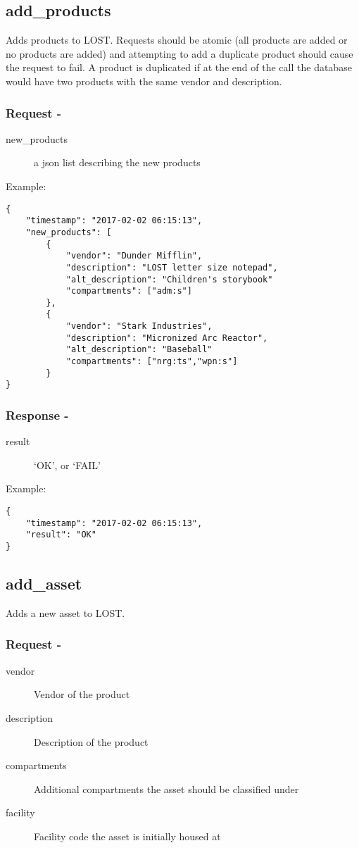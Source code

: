 \subsection*{add\_products}
Adds products to LOST. Requests should be atomic (all products are added or no products are added) and attempting to add a duplicate product should cause the request to fail. A product is duplicated if at the end of the call the database would have two products with the same vendor and description.
\\

\subsubsection*{Request -}
\begin{description}
\item[new\_products] a json list describing the new products
\end{description}

\noindent Example:
\begin{verbatim}
{
    "timestamp": "2017-02-02 06:15:13",
    "new_products": [
        {
            "vendor": "Dunder Mifflin",
            "description": "LOST letter size notepad",
            "alt_description": "Children's storybook"
            "compartments": ["adm:s"]
        },
        {
            "vendor": "Stark Industries",
            "description": "Micronized Arc Reactor",
            "alt_description": "Baseball"
            "compartments": ["nrg:ts","wpn:s"]
        }
}
\end{verbatim}

\subsubsection*{Response -}
\begin{description}
\item[result] `OK', or `FAIL'
\end{description}

\noindent Example:
\begin{verbatim}
{
    "timestamp": "2017-02-02 06:15:13",
    "result": "OK"
}
\end{verbatim}


\subsection*{add\_asset}
Adds a new asset to LOST.
\\
\subsubsection*{Request -}
\begin{description}
\item[vendor] Vendor of the product
\item[description] Description of the product
\item[compartments] Additional compartments the asset should be classified under
\item[facility] Facility code the asset is initially housed at
\end{description}

